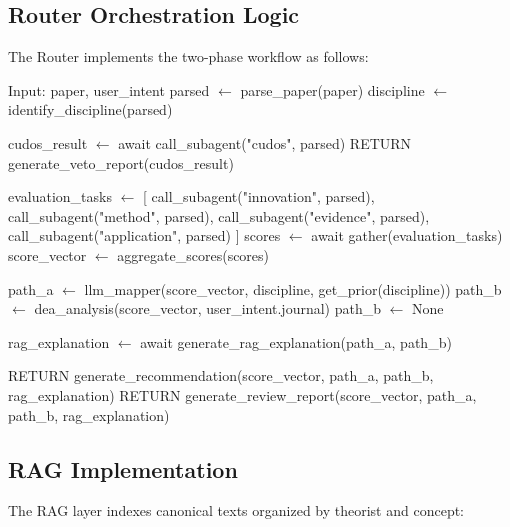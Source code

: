 \documentclass[11pt,a4paper]{article}
\newcommand{\rag}{RAG}
\begin{document}
\subsection{Router Orchestration Logic}

The Router implements the two-phase workflow as follows:

\begin{algorithm}[H]
\caption{Router Orchestration}
\label{alg:router}
\begin{algorithmic}
\STATE Input: paper, user\_intent
\STATE parsed $\leftarrow$ parse\_paper(paper)
\STATE discipline $\leftarrow$ identify\_discipline(parsed)

\STATE cudos\_result $\leftarrow$ await call\_subagent("cudos", parsed)
    \STATE RETURN generate\_veto\_report(cudos\_result)
\ENDIF

\STATE evaluation\_tasks $\leftarrow$ [
    call\_subagent("innovation", parsed),
    call\_subagent("method", parsed),
    call\_subagent("evidence", parsed),
    call\_subagent("application", parsed)
]
\STATE scores $\leftarrow$ await gather(evaluation\_tasks)
\STATE score\_vector $\leftarrow$ aggregate\_scores(scores)

\STATE path\_a $\leftarrow$ llm\_mapper(score\_vector, discipline, get\_prior(discipline))
    \STATE path\_b $\leftarrow$ dea\_analysis(score\_vector, user\_intent.journal)
\ELSE
    \STATE path\_b $\leftarrow$ None
\ENDIF

    \STATE rag\_explanation $\leftarrow$ await generate\_rag\_explanation(path\_a, path\_b)
\ENDIF

    \STATE RETURN generate\_recommendation(score\_vector, path\_a, path\_b, rag\_explanation)
\ELSE
    \STATE RETURN generate\_review\_report(score\_vector, path\_a, path\_b, rag\_explanation)
\ENDIF
\end{algorithmic}
\end{algorithm}

\subsection{RAG Implementation}

The \rag{} layer indexes canonical texts organized by theorist and concept:
\end{document}

